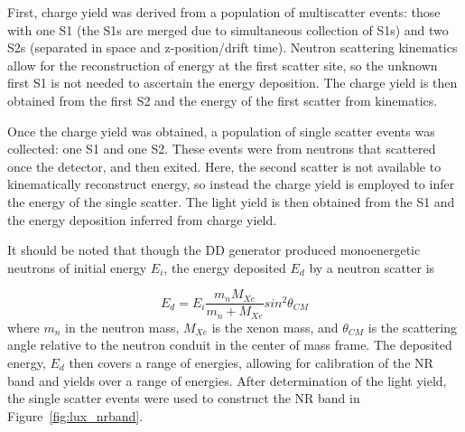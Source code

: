 First, charge yield was derived from a population of multiscatter events: those with one S1 (the S1s are merged due to simultaneous collection of S1s) and two S2s (separated in space and z-position/drift time). Neutron scattering kinematics allow for the reconstruction of energy at the first scatter site, so the unknown first S1 is not needed to ascertain the energy deposition. The charge yield is then obtained from the first S2 and the energy of the first scatter from kinematics. 

Once the charge yield was obtained, a population of single scatter events was collected: one S1 and one S2. These events were from neutrons that scattered once the detector, and then exited. Here, the second scatter is not available to kinematically reconstruct energy, so instead the charge yield is employed to infer the energy of the single scatter. The light yield is then obtained from the S1 and the energy deposition inferred from charge yield. 

It should be noted that though the \ac{DD} generator produced monoenergetic neutrons of initial energy $E_{i}$, the energy deposited $E_{d}$ by a neutron scatter is

\begin{equation}
E_{d} = E_{i} \frac{m_{n} M_{Xe}}{m_{n} + M_{Xe}} sin^{2}\theta_{CM}
\end{equation}
where $m_{n}$ in the neutron mass, $M_{Xe}$ is the xenon mass, and $\theta_{CM}$ is the scattering angle relative to the neutron conduit in the center of mass frame. The deposited energy, $E_{d}$ then covers a range of energies, allowing for calibration of the \ac{NR} band and yields over a range of energies. After determination of the light yield, the single scatter events were used to construct the \ac{NR} band in Figure~\ref{fig:lux_nrband}.

